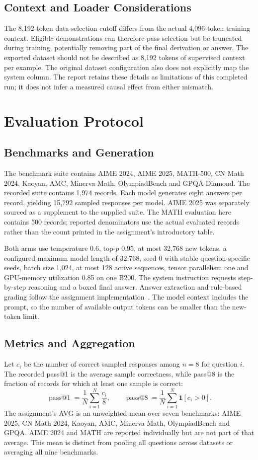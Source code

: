 \documentclass[11pt,letterpaper]{article}
\begin{document}
\subsection{Context and Loader Considerations}
The 8,192-token data-selection cutoff differs from the actual 4,096-token training context. Eligible demonstrations can therefore pass selection but be truncated during training, potentially removing part of the final derivation or answer. The exported dataset should not be described as 8,192 tokens of supervised context per example. The original dataset configuration also does not explicitly map the system column. The report retains these details as limitations of this completed run; it does not infer a measured causal effect from either mismatch.

\section{Evaluation Protocol}
\subsection{Benchmarks and Generation}
The benchmark suite contains AIME 2024, AIME 2025, MATH-500, CN Math 2024, Kaoyan, AMC, Minerva Math, OlympiadBench and GPQA-Diamond. The recorded suite contains 1,974 records. Each model generates eight answers per record, yielding 15,792 sampled responses per model. AIME 2025 was separately sourced as a supplement to the supplied suite. The MATH evaluation here contains 500 records; reported denominators use the actual evaluated records rather than the count printed in the assignment's introductory table.

Both arms use temperature 0.6, top-$p$ 0.95, at most 32,768 new tokens, a configured maximum model length of 32,768, seed 0 with stable question-specific seeds, batch size 1,024, at most 128 active sequences, tensor parallelism one and GPU-memory utilization 0.85 on one B200. The system instruction requests step-by-step reasoning and a boxed final answer. Answer extraction and rule-based grading follow the assignment implementation~\cite{assignment}. The model context includes the prompt, so the number of available output tokens can be smaller than the new-token limit.

\subsection{Metrics and Aggregation}
Let $c_i$ be the number of correct sampled responses among $n=8$ for question $i$. The recorded pass@1 is the average sample correctness, while pass@8 is the fraction of records for which at least one sample is correct:
\begin{equation}
 \operatorname{pass@1}=\frac{1}{N}\sum_{i=1}^{N}\frac{c_i}{8},
 \qquad
 \operatorname{pass@8}=\frac{1}{N}\sum_{i=1}^{N}\mathbf{1}[c_i>0].
\end{equation}
The assignment's AVG is an unweighted mean over seven benchmarks: AIME 2025, CN Math 2024, Kaoyan, AMC, Minerva Math, OlympiadBench and GPQA. AIME 2024 and MATH are reported individually but are not part of that average. This mean is distinct from pooling all questions across datasets or averaging all nine benchmarks.
\end{document}
